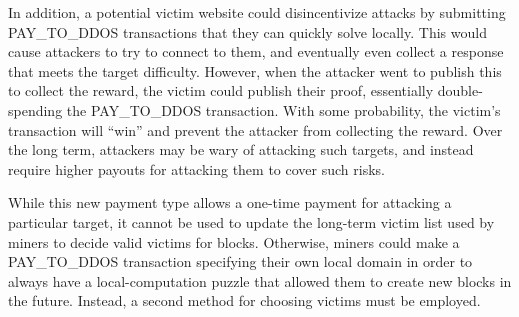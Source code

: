 In addition, a potential victim website could
disincentivize attacks by submitting PAY\_TO\_DDOS transactions that they can
quickly solve locally. This would cause attackers to try to connect to them, and
eventually even collect a response that meets the target difficulty. However,
when the attacker went to publish this to collect the reward, the victim could
publish their proof, essentially double-spending the PAY\_TO\_DDOS transaction.
With some probability, the victim's transaction will ``win'' and prevent the
attacker from collecting the reward. Over the long term, attackers may be wary
of attacking such targets, and instead require higher payouts for attacking them
to cover such risks.




%

While this new payment type allows a one-time payment for attacking a particular
target, it cannot be used to update the long-term victim list used by miners to
decide valid victims for blocks. Otherwise, miners could make a PAY\_TO\_DDOS
transaction specifying their own local domain in order to always have a
local-computation puzzle that allowed them to create new blocks in the future.
Instead, a second method for choosing victims must be employed.

